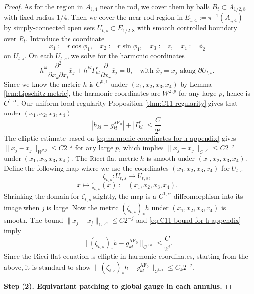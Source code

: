 \documentclass[a4paper,11pt]{amsart}
\theoremstyle{definition}
\numberwithin{equation}{section}
\DeclareMathOperator{\AF}{AF}
\begin{document}
\begin{proof}
    As for the region in $A_{1,4}$ near the rod, we cover them by balls $B_t\subset A_{1/2,8}$ with fixed radius $1/4$. Then we cover the near rod region in $E_{1,4}:=\pi^{-1}(A_{1,4})$ by simply-connected open sets $U_{t,s}\subset E_{1/2,8}$ with smooth controlled boundary over $B_t$.  Introduce the coordinate
    $$x_1:=r\cos\phi_1,\quad x_2:=r\sin\phi_1,\quad x_3:=z,\quad x_4:=\phi_2$$
    on $U_{t,s}$. On each $U_{t,s}$, we solve for the harmonic coordinates
    \begin{equation}
        {h}^{kl}\frac{\partial^2}{\partial x_k\partial x_l}\overline{x}_j+{h}^{kl}{\Gamma}^r_{kl}\frac{\partial}{\partial x_r}\overline{x}_j=0,\quad \text{with }\overline{x}_j=x_j\text{ along }\partial U_{t,s}.\label{eq:harmonic coordinates for h appendix}
    \end{equation}
    Since we know the metric $h$ is $C^{0,1}$ under $(x_1,x_2,x_3,x_4)$ by Lemma \ref{lem:Lipschitz metric}, the harmonic coordinates are $W^{2,p}$ for any large $p$, hence is $C^{1,\alpha}$. Our uniform local regularity Proposition \ref{thm:C11 regularity} gives that under $(x_1,x_2,x_3,x_4)$
    \begin{equation}\label{eq:C11 bound for h appendix}
        |h_{kl}-g^{\AF_0}_{kl}|+|\Gamma^r_{kl}|\leq\frac{C}{2^j}.
    \end{equation}
    The elliptic estimate based on \eqref{eq:harmonic coordinates for h appendix} gives $\|\overline{x}_j-x_j\|_{W^{2,p}}\leq C2^{-j}$ for any large $p$, which implies $\|\overline{x}_j-x_j\|_{C^{1,\alpha}}\leq C2^{-j}$ under $(x_1,x_2,x_3,x_4)$. The Ricci-flat metric $h$ is smooth under $(\overline{x}_1,\overline{x}_2,\overline{x}_3,\overline{x}_4)$. Define the following map where we use the coordinates $(x_1,x_2,x_3,x_4)$ for $U_{t,s}$
    $$\zeta_{t,s}:U_{t,s}\to U_{t,s},$$
    $$x\mapsto \zeta_{t,s}(x):=(\overline{x}_1,\overline{x}_2,\overline{x}_3,\overline{x}_4).$$
    Shrinking the domain for $\zeta_{t,s}$ slightly, the map is a $C^{1,\alpha}$ diffeomorphism into its image when $j$ is large. Now the metric $(\zeta_{t,s})_*h$ under $(x_1,x_2,x_3,x_4)$ is smooth. The bound $\|\overline{x}_j-x_j\|_{C^{1,\alpha}}\leq C2^{-j}$ and \eqref{eq:C11 bound for h appendix} imply
    $$\|(\zeta_{t,s})_*h-g^{\AF_0}_{kl}\|_{C^{0,\alpha}}\leq \frac{C}{2^j}.$$
    Since the Ricci-flat equation is elliptic in harmonic coordinates, starting from the above, it is standard to show $\|(\zeta_{t,s})_*h-g^{\AF_0}_{kl}\|_{C^{k,\alpha}}\leq C_k2^{-j}$.




    \vspace{10pt}
    \noindent\textbf{Step (2). Equivariant patching to global gauge in each annulus.}
    \vspace{10pt}




\end{proof}
\end{document}
